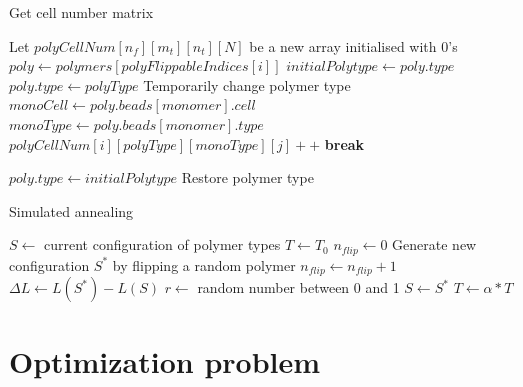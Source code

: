 \documentclass[bachelor,       %
               twoside,        %
               BCOR10mm,       %
               ngerman, english %
               ]{GAUBM}
\begin{document}
\begin{algorithm}
\caption{Get cell number matrix}\label{alg:get_cell_numbers}
\begin{algorithmic}
\State Let $polyCellNum[n_f][m_t][n_t][N]$ be a new array initialised with $0$'s
    \State $poly \gets polymers[polyFlippableIndices[i]]$
    \State $initialPolytype\gets poly.type$
        \State $poly.type\gets polyType$
        \Comment Temporarily change polymer type
            \State $monoCell\gets poly.beads[monomer].cell$
            \State $monoType\gets poly.beads[monomer].type$
                \State $polyCellNum[i][polyType][monoType][j]++$ 
                \State \textbf{break}
            \EndIf
            \EndFor
        \EndFor
    \EndFor
    
    \State $poly.type\gets initialPolytype$
    \Comment Restore polymer type
\EndFor
\end{algorithmic}
\end{algorithm}

\begin{algorithm}[H]
\caption{Simulated annealing}\label{alg:sa}
\begin{algorithmic}
\State $S \gets$ current configuration of polymer types
\State $T \gets T_0$
    \State $n_{flip} \gets 0$
        \State Generate new configuration $S^*$ by flipping a random polymer
        \State $n_{flip}\gets n_{flip}+1$
        \State $\Delta L\gets L(S^*)-L(S)$
        \State $r\gets$ random number between 0 and 1
            \State $S\gets S^*$
        \EndIf
    \EndWhile
\State $T\gets\alpha*T$ 
\EndWhile
\end{algorithmic}
\end{algorithm}

\chapter{Optimization problem}
\end{document}
